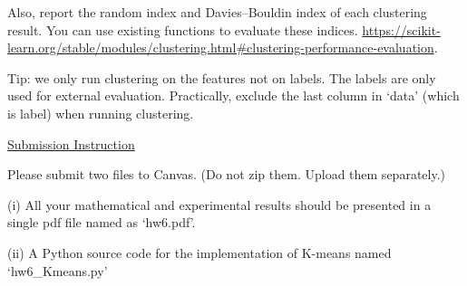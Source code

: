\documentclass{llncs}
\begin{document}
Also, report the random index and Davies–Bouldin index of 
each clustering result. You can use existing functions 
to evaluate these indices.
\url{https://scikit-learn.org/stable/modules/clustering.html#clustering-performance-evaluation}. 

Tip: we only run clustering on the features not 
on labels. The labels are only used for external 
evaluation. Practically, exclude the last column 
in `data' (which is label) when running clustering. 

\vfill 
 
\underline{Submission Instruction}

Please submit two files to Canvas. (Do not 
zip them. Upload them separately.) 

(i) All your mathematical and experimental results 
should be presented in a single pdf file named 
as `hw6.pdf'. 

(ii) A Python source code for the 
implementation of K-means named `hw6\_Kmeans.py'
\end{document}
